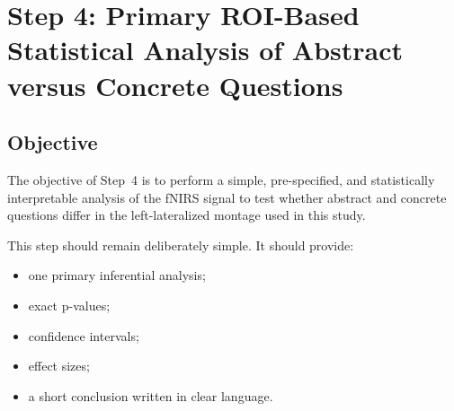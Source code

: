 \section{Step 4: Primary ROI-Based Statistical Analysis of Abstract versus Concrete Questions}
\label{sec:step4_fnirs_analysis}

\subsection{Objective}
The objective of Step~4 is to perform a simple, pre-specified, and statistically interpretable
analysis of the fNIRS signal to test whether abstract and concrete questions differ in the
left-lateralized montage used in this study.

This step should remain deliberately simple.
It should provide:
\begin{itemize}
    \item one primary inferential analysis;
    \item exact p-values;
    \item confidence intervals;
    \item effect sizes;
    \item a short conclusion written in clear language.
\end{itemize}

